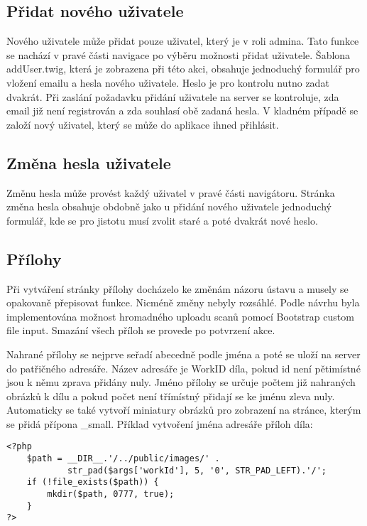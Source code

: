         \subsection{Přidat nového uživatele}
            Nového uživatele může přidat pouze uživatel, který je v roli admina. Tato funkce se nachází v pravé části navigace po výběru možnosti přidat uživatele. Šablona addUser.twig, která je zobrazena při této akci, obsahuje jednoduchý formulář pro vložení emailu a hesla nového uživatele. Heslo je pro kontrolu nutno zadat dvakrát. Při zaslání požadavku přidání uživatele na server se kontroluje, zda email již není registrován a zda souhlasí obě zadaná hesla. V kladném případě se založí nový uživatel, který se může do aplikace ihned přihlásit.
        
        \subsection{Změna hesla uživatele}
            Změnu hesla může provést každý uživatel v pravé části navigátoru. Stránka změna hesla obsahuje obdobně jako u přidání nového uživatele jednoduchý formulář, kde se pro jistotu musí zvolit staré a poté dvakrát nové heslo.
        
        \subsection{Přílohy}
            Při vytváření stránky přílohy docházelo ke změnám názoru ústavu a musely se opakovaně přepisovat funkce. Nicméně změny nebyly rozsáhlé. Podle návrhu byla implementována možnost hromadného uploadu scanů pomocí Bootstrap custom file input. Smazání všech příloh se provede po potvrzení akce.
            
            Nahrané přílohy se nejprve seřadí abecedně podle jména a poté se uloží na server do patřičného adresáře. Název adresáře je WorkID díla, pokud id není pětimístné jsou k němu zprava přidány nuly. Jméno přílohy se určuje počtem již nahraných obrázků k dílu a pokud počet není třímístný přidají se ke jménu zleva nuly. Automaticky se také vytvoří miniatury obrázků pro zobrazení na stránce, kterým se přidá přípona \_small.
            Příklad vytvoření jména adresáře příloh díla:
            \begin{verbatim}
<?php
    $path = __DIR__.'/../public/images/' .
            str_pad($args['workId'], 5, '0', STR_PAD_LEFT).'/';
    if (!file_exists($path)) {
        mkdir($path, 0777, true);
    }
?>
            \end{verbatim}

